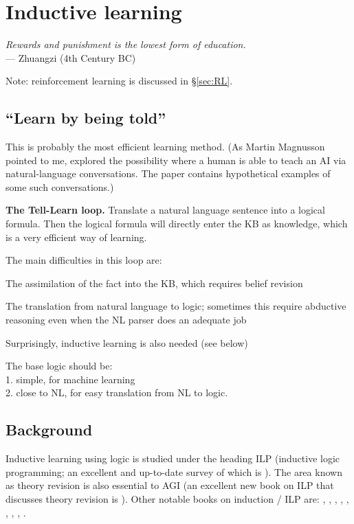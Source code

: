 \chapter{Inductive learning}
\label{ch:machine-learning}
\begin{flushright}
\emph{Rewards and punishment is the lowest form of education.}\\
--- Zhuangzi (4th Century BC)
\end{flushright}
\minitoc

Note:  reinforcement learning is discussed in \S\ref{sec:RL}.

\section{``Learn by being told''}
\label{sec:learn-by-being-told}

This is probably the most efficient learning method.  (As Martin Magnusson pointed to me, \citep*{Perlis1996} explored the possibility where a human is able to teach an AI via natural-language conversations.  The paper contains hypothetical examples of some such conversations.)

\textbf{The Tell-Learn loop.}  Translate a natural language sentence into a logical formula.  Then the logical formula will directly enter the KB as knowledge, which is a very efficient way of learning.

The main difficulties in this loop are:
\begin{compactenum}[1.]
\item  The assimilation of the fact into the KB, which requires belief revision
\item  The translation from natural language to logic;  sometimes this require abductive reasoning even when the NL parser does an adequate job
\item  Surprisingly, inductive learning is also needed (see below)\\
\end{compactenum}

The base logic should be:\\
1. simple, for machine learning\\
2. close to NL, for easy translation from NL to logic.

\section{Background}
\label{sec:inductive-learner}

Inductive learning using logic is studied under the heading ILP (inductive logic programming; an excellent and up-to-date survey of which is \citep*{Konstantopoulos2008}).  The area known as theory revision is also essential to AGI (an excellent new book on ILP that discusses theory revision is \citep*{DeRaedt2008}).  Other notable books on induction / ILP are: \citep*{Holland1986}, \citep*{Muggleton1992}, \citep*{Lavrac1994}, \citep*{Bergadano1996}, \citep*{Nienhuys-Cheng1997}, \citep*{Flach2000}, \citep*{Lloyd2003}, \citep*{Getoor2007}, \citep*{DeRaedt2008}.

